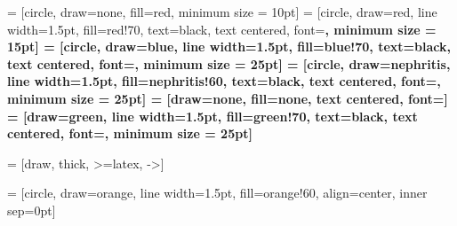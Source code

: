 
 = [circle, draw=none, fill=red, minimum size = 10pt]
 = [circle, draw=red, line width=1.5pt, fill=red!70, text=black,
text centered, font=\bf \normalsize, minimum size = 15pt]
 = [circle, draw=blue, line width=1.5pt, fill=blue!70, text=black, text centered, font=\bf \normalsize, minimum size = 25pt]
 = [circle, draw=nephritis, line width=1.5pt, fill=nephritis!60, text=black, text centered, font=\bf \normalsize, minimum size = 25pt]
 = [draw=none, fill=none, text centered, font=\bf \normalsize]
= [draw=green, line width=1.5pt, fill=green!70, text=black,
text centered, font=\bf \normalsize, minimum size = 25pt]

  = [draw, thick, >=latex, ->]

 = [circle, draw=orange, line width=1.5pt, fill=orange!60, align=center, inner sep=0pt]


